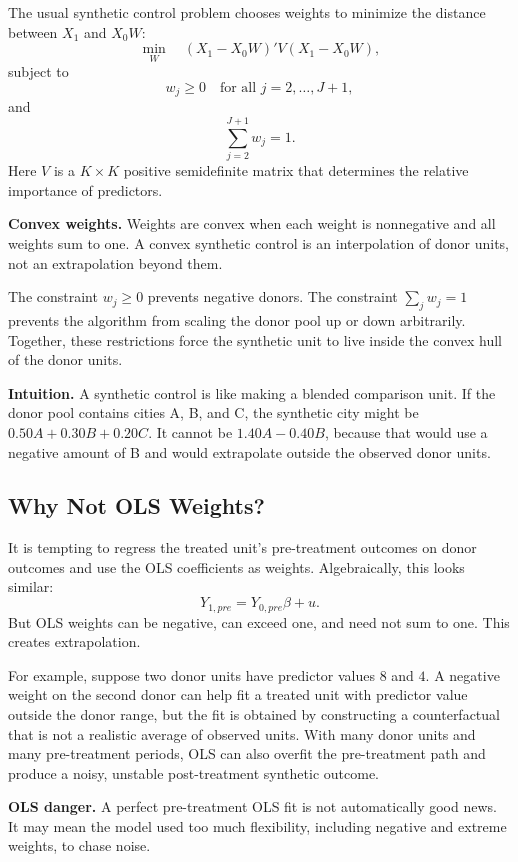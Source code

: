 The usual synthetic control problem chooses weights to minimize the distance between \(X_1\) and \(X_0W\):
\[
\min_W \quad (X_1-X_0W)'V(X_1-X_0W),
\]
subject to
\[
w_j\geq 0 \quad \text{for all }j=2,\ldots,J+1,
\]
and
\[
\sum_{j=2}^{J+1}w_j=1.
\]
Here \(V\) is a \(K\times K\) positive semidefinite matrix that determines the relative importance of predictors.

\begin{defN}
\textbf{Convex weights.} Weights are convex when each weight is nonnegative and all weights sum to one. A convex synthetic control is an interpolation of donor units, not an extrapolation beyond them.
\end{defN}

The constraint \(w_j\geq 0\) prevents negative donors. The constraint \(\sum_j w_j=1\) prevents the algorithm from scaling the donor pool up or down arbitrarily. Together, these restrictions force the synthetic unit to live inside the convex hull of the donor units.

\begin{boxF}
\textbf{Intuition.} A synthetic control is like making a blended comparison unit. If the donor pool contains cities A, B, and C, the synthetic city might be \(0.50A+0.30B+0.20C\). It cannot be \(1.40A-0.40B\), because that would use a negative amount of B and would extrapolate outside the observed donor units.
\end{boxF}

\subsection{Why Not OLS Weights?}

It is tempting to regress the treated unit's pre-treatment outcomes on donor outcomes and use the OLS coefficients as weights. Algebraically, this looks similar:
\[
Y_{1,pre}=Y_{0,pre}\beta+u.
\]
But OLS weights can be negative, can exceed one, and need not sum to one. This creates extrapolation.

For example, suppose two donor units have predictor values \(8\) and \(4\). A negative weight on the second donor can help fit a treated unit with predictor value outside the donor range, but the fit is obtained by constructing a counterfactual that is not a realistic average of observed units. With many donor units and many pre-treatment periods, OLS can also overfit the pre-treatment path and produce a noisy, unstable post-treatment synthetic outcome.

\begin{boxD}
\textbf{OLS danger.} A perfect pre-treatment OLS fit is not automatically good news. It may mean the model used too much flexibility, including negative and extreme weights, to chase noise.
\end{boxD}

